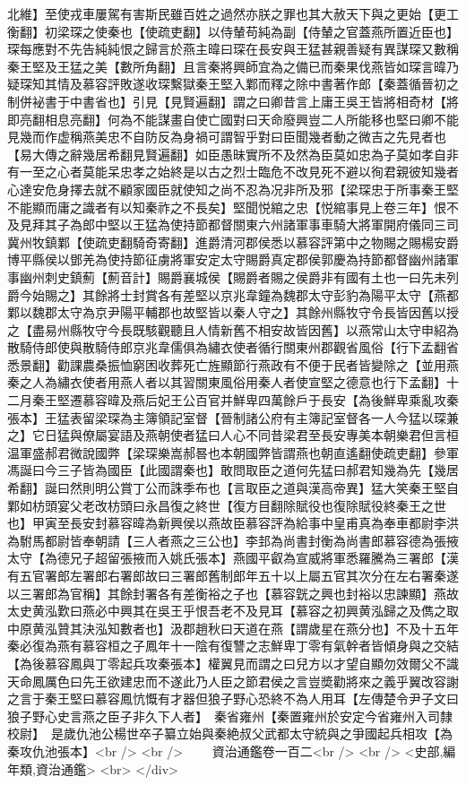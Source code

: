北維】至使戎車屢駕有害斯民雖百姓之過然亦朕之罪也其大赦天下與之更始【更工衡翻】初梁琛之使秦也【使疏吏翻】以侍輦苟純為副【侍輦之官蓋燕所置近臣也】琛每應對不先告純純恨之歸言於燕主暐曰琛在長安與王猛甚親善疑有異謀琛又數稱秦王堅及王猛之美【數所角翻】且言秦將興師宜為之備已而秦果伐燕皆如琛言暐乃疑琛知其情及慕容評敗遂收琛繫獄秦王堅入鄴而釋之除中書著作郎【秦蓋循晉初之制併袐書于中書省也】引見【見賢遍翻】謂之曰卿昔言上庸王吳王皆將相奇材【將即亮翻相息亮翻】何為不能謀畫自使亡國對曰天命廢興豈二人所能移也堅曰卿不能見幾而作虚稱燕美忠不自防反為身禍可謂智乎對曰臣聞幾者動之微吉之先見者也【易大傳之辭幾居希翻見賢遍翻】如臣愚昧實所不及然為臣莫如忠為子莫如孝自非有一至之心者莫能呆忠孝之始終是以古之烈士臨危不改見死不避以徇君親彼知幾者心達安危身擇去就不顧家國臣就使知之尚不忍為况非所及邪【梁琛忠于所事秦王堅不能顯而庸之識者有以知秦祚之不長矣】堅聞悦綰之忠【悦綰事見上卷三年】恨不及見拜其子為郎中堅以王猛為使持節都督關東六州諸軍事車騎大將軍開府儀同三司冀州牧鎮鄴【使疏吏翻騎奇寄翻】進爵清河郡侯悉以慕容評第中之物賜之賜楊安爵博平縣侯以鄧羌為使持節征虜將軍安定太守賜爵真定郡侯郭慶為持節都督幽州諸軍事幽州刺史鎮薊【薊音計】賜爵襄城侯【賜爵者賜之侯爵非有國有土也一曰先未列爵今始賜之】其餘將士封賞各有差堅以京兆韋鐘為魏郡太守彭豹為陽平太守【燕都鄴以魏郡太守為京尹陽平輔郡也故堅皆以秦人守之】其餘州縣牧守令長皆因舊以授之【盡易州縣牧守今長既駭觀聽且人情新舊不相安故皆因舊】以燕常山太守申紹為散騎侍郎使與散騎侍郎京兆韋儒俱為繡衣使者循行關東州郡觀省風俗【行下孟翻省悉景翻】勸課農桑振恤窮困收葬死亡旌顯節行燕政有不便于民者皆變除之【並用燕秦之人為繡衣使者用燕人者以其習關東風俗用秦人者使宣堅之德意也行下孟翻】十二月秦王堅遷慕容暐及燕后妃王公百官并鮮卑四萬餘戶于長安【為後鮮卑乘亂攻秦張本】王猛表留梁琛為主簿領記室督【晉制諸公府有主簿記室督各一人今猛以琛兼之】它日猛與僚屬宴語及燕朝使者猛曰人心不同昔梁君至長安專美本朝樂君但言桓温軍盛郝君微說國弊【梁琛樂嵩郝晷也本朝國弊皆謂燕也朝直遙翻使疏吏翻】參軍馮誕曰今三子皆為國臣【此國謂秦也】敢問取臣之道何先猛曰郝君知幾為先【幾居希翻】誕曰然則明公賞丁公而誅季布也【言取臣之道與漢高帝異】猛大笑秦王堅自鄴如枋頭宴父老改枋頭曰永昌復之終世【復方目翻除賦役也復除賦役終秦王之世也】甲寅至長安封慕容暐為新興侯以燕故臣慕容評為給事中皇甫真為奉車都尉李洪為駙馬都尉皆奉朝請【三人者燕之三公也】李邽為尚書封衡為尚書郎慕容德為張掖太守【為德兄子超留張掖而入姚氏張本】燕國平叡為宣威將軍悉羅騰為三署郎【漢有五官署郎左署郎右署郎故曰三署郎舊制郎年五十以上屬五官其次分在左右署秦遂以三署郎為官稱】其餘封署各有差衡裕之子也【慕容皝之興也封裕以忠諫顯】燕故太史黄泓歎曰燕必中興其在吳王乎恨吾老不及見耳【慕容之初興黄泓歸之及儁之取中原黄泓贊其決泓知數者也】汲郡趙秋曰天道在燕【謂歲星在燕分也】不及十五年秦必復為燕有慕容桓之子鳳年十一陰有復讐之志鮮卑丁零有氣幹者皆傾身與之交結【為後慕容鳳與丁零起兵攻秦張本】權翼見而謂之曰兒方以才望自顯勿效爾父不識天命鳳厲色曰先王欲建忠而不遂此乃人臣之節君侯之言豈奬勸將來之義乎翼改容謝之言于秦王堅曰慕容鳳忼慨有才器但狼子野心恐終不為人用耳【左傳楚令尹子文曰狼子野心史言燕之臣子非久下人者】　秦省雍州【秦置雍州於安定今省雍州入司隸校尉】　是歲仇池公楊世卒子纂立始與秦絶叔父武都太守統與之爭國起兵相攻【為秦攻仇池張本】<br />
<br />
　　資治通鑑卷一百二<br />
<br />
<史部,編年類,資治通鑑>  <br>
   </div> 

